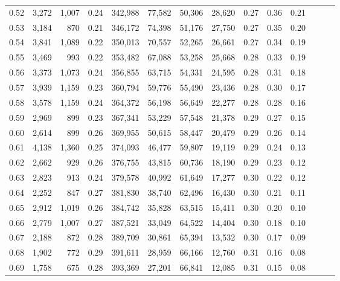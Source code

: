 \begin{tabular}{rrrrrrrrrrrrrr}
0.52 &   3,272 &  1,007 &  0.24 &  342,988 &   77,582 &  50,306 &  28,620 &  0.27 &  0.36 &      0.21 \\
0.53 &   3,184 &    870 &  0.21 &  346,172 &   74,398 &  51,176 &  27,750 &  0.27 &  0.35 &      0.20 \\
0.54 &   3,841 &  1,089 &  0.22 &  350,013 &   70,557 &  52,265 &  26,661 &  0.27 &  0.34 &      0.19 \\
0.55 &   3,469 &    993 &  0.22 &  353,482 &   67,088 &  53,258 &  25,668 &  0.28 &  0.33 &      0.19 \\
0.56 &   3,373 &  1,073 &  0.24 &  356,855 &   63,715 &  54,331 &  24,595 &  0.28 &  0.31 &      0.18 \\
0.57 &   3,939 &  1,159 &  0.23 &  360,794 &   59,776 &  55,490 &  23,436 &  0.28 &  0.30 &      0.17 \\
0.58 &   3,578 &  1,159 &  0.24 &  364,372 &   56,198 &  56,649 &  22,277 &  0.28 &  0.28 &      0.16 \\
0.59 &   2,969 &    899 &  0.23 &  367,341 &   53,229 &  57,548 &  21,378 &  0.29 &  0.27 &      0.15 \\
0.60 &   2,614 &    899 &  0.26 &  369,955 &   50,615 &  58,447 &  20,479 &  0.29 &  0.26 &      0.14 \\
0.61 &   4,138 &  1,360 &  0.25 &  374,093 &   46,477 &  59,807 &  19,119 &  0.29 &  0.24 &      0.13 \\
0.62 &   2,662 &    929 &  0.26 &  376,755 &   43,815 &  60,736 &  18,190 &  0.29 &  0.23 &      0.12 \\
0.63 &   2,823 &    913 &  0.24 &  379,578 &   40,992 &  61,649 &  17,277 &  0.30 &  0.22 &      0.12 \\
0.64 &   2,252 &    847 &  0.27 &  381,830 &   38,740 &  62,496 &  16,430 &  0.30 &  0.21 &      0.11 \\
0.65 &   2,912 &  1,019 &  0.26 &  384,742 &   35,828 &  63,515 &  15,411 &  0.30 &  0.20 &      0.10 \\
0.66 &   2,779 &  1,007 &  0.27 &  387,521 &   33,049 &  64,522 &  14,404 &  0.30 &  0.18 &      0.10 \\
0.67 &   2,188 &    872 &  0.28 &  389,709 &   30,861 &  65,394 &  13,532 &  0.30 &  0.17 &      0.09 \\
0.68 &   1,902 &    772 &  0.29 &  391,611 &   28,959 &  66,166 &  12,760 &  0.31 &  0.16 &      0.08 \\
0.69 &   1,758 &    675 &  0.28 &  393,369 &   27,201 &  66,841 &  12,085 &  0.31 &  0.15 &      0.08 \\

\end{tabular}
